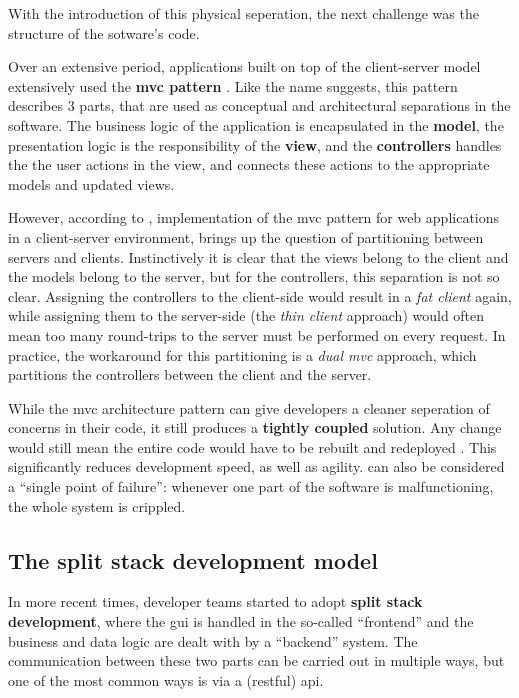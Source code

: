 
With the introduction of this physical seperation, the next challenge was the
structure of the sotware's code.  

Over an extensive period, applications built on top of the client-server model
extensively used the \textbf{\gls{mvc} pattern} \autocite{Pavlenko_etal_2020}. Like the
name suggests, this pattern describes 3 parts, that are used as conceptual and
architectural separations in the software. The business logic of the application
is encapsulated in the \textbf{model}, the presentation logic is the
responsibility of the \textbf{view}, and the \textbf{controllers} handles the
the user actions in the view, and connects these actions to the appropriate
models and updated views.

However, according to \textcite{Leff_Raylfield_2001}, implementation of the
\gls{mvc} pattern for web applications in a client-server environment, brings up
the question of partitioning between servers and clients. Instinctively it is
clear that the views belong to the client and the models belong to the server,
but for the controllers, this separation is not so clear. Assigning the
controllers to the client-side would result in a \textit{fat client} again,
while assigning them to the server-side (the \textit{thin client} approach)
would often mean too many round-trips to the server must be performed on every
request. In practice, the workaround for this partitioning is a \textit{dual
\gls{mvc}} approach, which partitions the controllers between the client and the
server.


While the \gls{mvc} architecture pattern can give developers a cleaner
seperation of concerns in their code, it still produces a \textbf{tightly
coupled} solution. Any change would still mean the entire code would have to be
rebuilt and redeployed \autocite{Fowler_Microservices_2014}. This significantly
reduces development speed, as well as agility.  can also be considered
a  ``single point of failure'': whenever one part of the software is
malfunctioning, the whole system is crippled.


\subsection{The split stack development model}
\label{ssec:split-stack}


In more recent times, developer teams started to adopt \textbf{split stack
development}, where the \gls{gui} is handled in the so-called ``\gls{frontend}'' and
the business and data logic are dealt with by a ``\gls{backend}'' system. The
communication between these two parts can be carried out in multiple ways, but
one of the most common ways is via a (\gls{restful}) \gls{api}.


